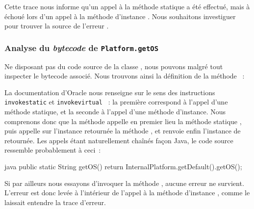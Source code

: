 Cette trace nous informe qu'un appel à la méthode statique  a été effectué, mais à échoué lors d'un appel à la méthode d'instance %
.
Nous souhaitons investiguer pour trouver la source de l'erreur .


\subsubsection{Analyse du \textit{bytecode} de \texttt{Platform.getOS}}

Ne disposant pas du code source de la classe , nous pouvons malgré tout inspecter le bytecode associé.
Nous trouvons ainsi la définition de la méthode ~:


La documentation d'Oracle nous renseigne sur le sens des instructions \texttt{invokestatic} \cite{javainvokestatic} et \texttt{invokevirtual} \cite{javainvokevirtual}~: %
la première correspond à l'appel d'une méthode statique, et la seconde à l'appel d'une méthode d'instance.
Nous comprenons donc que la méthode  appelle en premier lieu la méthode statique , %
puis appelle sur l'instance retournée la méthode , et renvoie enfin l'instance de  retournée.
Les appels étant naturellement chaînés façon Java, le code source ressemble probablement à ceci~:

\begin{imtaCode}{java}
public static String getOS() {
    return InternalPlatform.getDefault().getOS();
}
\end{imtaCode}

Si par ailleurs nous essayons d'invoquer la méthode , aucune erreur ne survient.
L'erreur est donc levée à l'intérieur de l'appel à la méthode d'instance , comme le laissait entendre la trace d'erreur.


